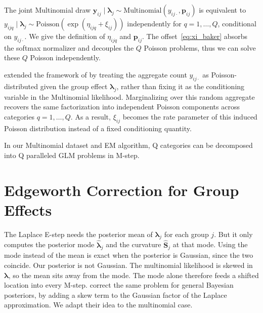 The joint Multinomial draw $\bm{y}_{ij} \mid \bm{\lambda}_{j} \sim \mathrm{Multinomial}(y_{ij\cdot}, \bm{p}_{ij})$ is equivalent to $y_{ijq} \mid \bm{\lambda}_{j} \sim \mathrm{Poisson}(\exp(\eta_{ijq} + \xi_{ij}))$ independently for $q = 1, \ldots, Q$, conditional on $y_{ij\cdot}$. We give the definition of $\eta_{ijq}$ and $\bm{p}_{ij}$. The offset~\eqref{eq:xi_baker} absorbs the softmax normalizer and decouples the $Q$ Poisson problems, thus we can solve these $Q$ Poisson independently. 

\citet{Lee2017} extended the framework of \citet{Baker1994} by treating the aggregate count $y_{ij\cdot}$ as Poisson-distributed given the group effect $\bm{\lambda}_{j}$, rather than fixing it as the conditioning variable in the Multinomial likelihood. Marginalizing over this random aggregate recovers the same factorization into independent Poisson components across categories $q = 1, \dots, Q$. As a result, $\xi_{ij}$ becomes the rate parameter of this induced Poisson distribution instead of a fixed conditioning quantity.

In our Multinomial dataset and EM algorithm, Q categories can be decomposed into Q paralleled GLM problems in M-step.

\section{Edgeworth Correction for Group Effects}
\label{subsec:corrected-lambda}

The Laplace E-step needs the posterior mean of $\bm{\lambda}_j$ for each group $j$. But it only computes the posterior mode $\hat{\bm{\lambda}}_j$ and the curvature $\hat{\mathbf{S}}_j$ at that mode. Using the mode instead of the mean is exact when the posterior is Gaussian, since the two coincide. Our posterior is not Gaussian. The multinomial likelihood is skewed in $\bm{\lambda}$, so the mean sits away from the mode. The mode alone therefore feeds a shifted location into every M-step. \citet{katsevich2024} correct the same problem for general Bayesian posteriors, by adding a skew term to the Gaussian factor of the Laplace approximation. We adapt their idea to the multinomial case.

